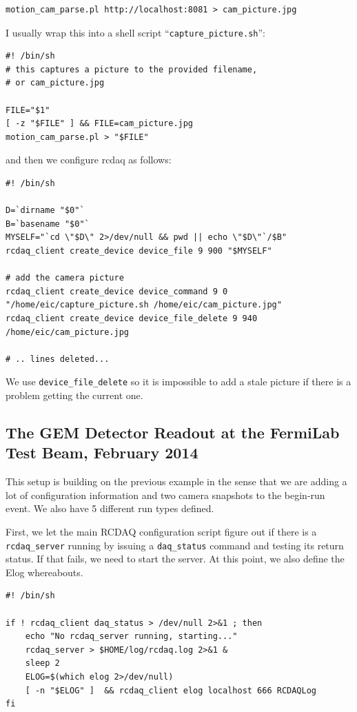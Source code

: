 \documentclass{article}[11pt]
\begin{document}
\begin{verbatim}
motion_cam_parse.pl http://localhost:8081 > cam_picture.jpg
\end{verbatim}

I usually wrap this into a shell script ``\verb|capture_picture.sh|'':

\begin{verbatim}
#! /bin/sh
# this captures a picture to the provided filename,
# or cam_picture.jpg

FILE="$1"
[ -z "$FILE" ] && FILE=cam_picture.jpg
motion_cam_parse.pl > "$FILE"

\end{verbatim}

and then we configure rcdaq as follows:
\label{packet900}

\begin{verbatim} 
#! /bin/sh

D=`dirname "$0"`
B=`basename "$0"`
MYSELF="`cd \"$D\" 2>/dev/null && pwd || echo \"$D\"`/$B"
rcdaq_client create_device device_file 9 900 "$MYSELF"

# add the camera picture
rcdaq_client create_device device_command 9 0 "/home/eic/capture_picture.sh /home/eic/cam_picture.jpg"
rcdaq_client create_device device_file_delete 9 940 /home/eic/cam_picture.jpg

# .. lines deleted...
\end{verbatim}

We use \verb|device_file_delete| so it is impossible to add a stale
picture if there is a problem getting the current one.

\subsection{The GEM Detector Readout at the FermiLab Test Beam, February 2014}

This setup is building on the previous example in the sense that 
we are adding a lot of configuration information and two camera 
snapshots to the begin-run event. We also have 5 different run types defined.

First, we let the main RCDAQ configuration script figure out if there
is a \verb|rcdaq_server| running by issuing a \verb|daq_status|
command and testing its return status. If that fails, we need to start
the server. At this point, we also define the Elog whereabouts.

\begin{verbatim} 
#! /bin/sh

if ! rcdaq_client daq_status > /dev/null 2>&1 ; then
    echo "No rcdaq_server running, starting..."
    rcdaq_server > $HOME/log/rcdaq.log 2>&1 &
    sleep 2
    ELOG=$(which elog 2>/dev/null)
    [ -n "$ELOG" ]  && rcdaq_client elog localhost 666 RCDAQLog
fi
\end{verbatim} 
\end{document}
